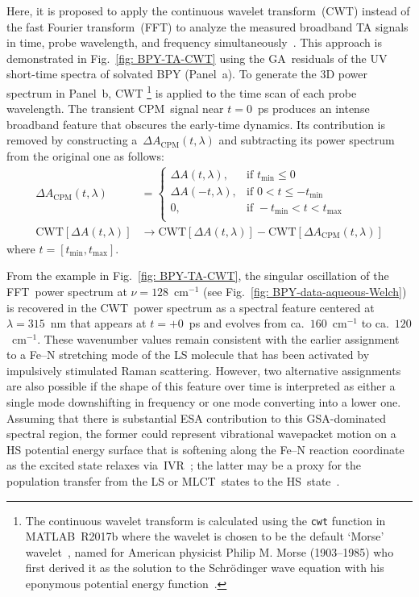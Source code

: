 Here, it is proposed to apply the continuous wavelet transform~(CWT)
instead of the fast Fourier transform~(FFT) to analyze the measured broadband TA signals
in time, probe wavelength, and frequency simultaneously~\cite{WaveletBook}.
%
This approach is demonstrated in Fig.~\ref{fig: BPY-TA-CWT}
using the GA~residuals of the UV short-time spectra of solvated BPY (Panel~a).
%
To generate the 3D power spectrum in Panel~b, CWT%
\footnote{The continuous wavelet transform is calculated
using the \texttt{cwt} function in \textsc{MATLAB}~R2017b
where the wavelet is chosen to be
the default `Morse' wavelet~\cite{Olhede2002, Olhede2012},
named for American physicist Philip M. Morse (1903--1985) who first derived
it as the solution to the Schr\"{o}dinger wave equation with
his eponymous potential energy function~\cite{Morse1929}.}
is applied to the time scan of each probe wavelength.
%
The transient CPM~signal near $t = 0$~ps produces an intense broadband feature
that obscures the early-time dynamics.
Its contribution is removed by constructing a~$\Delta A_\text{CPM}(t, \lambda)$
and subtracting its power spectrum from the original one as follows:
%
\begin{equation}
  \begin{aligned}
    \Delta A_\text{CPM}(t, \lambda) & =
      \begin{cases}
        \Delta A(t, \lambda), & \text{if } t_\text{min} \leq 0 \\
        \Delta A(-t, \lambda), & \text{if } 0 < t \leq -t_\text{min} \\
        0, & \text{if } -t_\text{min} < t < t_\text{max} \\
      \end{cases}
      \\
    \text{CWT}[\Delta A(t, \lambda)]
      & \rightarrow \text{CWT}[\Delta A(t, \lambda)] - \text{CWT}[\Delta A_\text{CPM}(t, \lambda)]
  \end{aligned}
\end{equation}
%
where $t = [t_\text{min}, t_\text{max}]$.

From the example in Fig.~\ref{fig: BPY-TA-CWT},
the singular oscillation of the FFT~power spectrum at $\nu = 128$~cm$^{-1}$
(see Fig.~\ref{fig: BPY-data-aqueous-Welch}) is recovered
in the CWT~power spectrum as a spectral feature centered at $\lambda = 315$~nm
that appears at $t = +0$~ps and evolves from ca.~$160$~cm$^{-1}$ to ca.~$120$~cm$^{-1}$.
%
These wavenumber values remain consistent with the earlier assignment
to a Fe--N stretching mode of the LS molecule that has been activated by
impulsively stimulated Raman scattering.
%
However, two alternative assignments are also possible
if the shape of this feature over time is interpreted as either
a single mode downshifting in frequency or one mode converting into a lower one.
%
Assuming that there is substantial ESA contribution to this GSA-dominated spectral region,
the former could represent vibrational wavepacket motion
on a HS potential energy surface that is softening along the Fe--N reaction coordinate
as the excited state relaxes via~IVR~\cite{Aubock2015};
the latter may be a proxy for the population transfer from the LS or MLCT~states
to the HS~state~\cite{Cammarata2014, Bertoni2015}.


